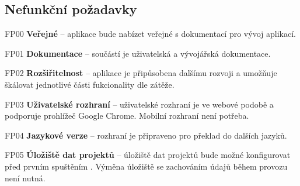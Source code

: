 \subsection{Nefunkční požadavky}
\begin{dl}
   \item[FP00] \textbf{Veřejné } – aplikace bude nabízet veřejné  s dokumentací pro vývoj aplikací.
   \item[FP01] \textbf{Dokumentace} – součástí  je uživatelská a vývojářská dokumentace.
   \item[FP02] \textbf{Rozšiřitelnost} – aplikace je připůsobena dalšímu rozvoji a umožňuje škálovat jednotlivé části fukcionality dle zátěže.
   \item[FP03] \textbf{Uživatelské rozhraní} – uživatelské rozhraní je ve webové podobě a podporuje prohlížeč Google Chrome.
   Mobilní rozhraní není potřeba.
   \item[FP04] \textbf{Jazykové verze} – rozhraní je připraveno pro překlad do dalších jazyků.
   \item[FP05] \textbf{Úložiště dat projektů} – úložiště dat projektů bude možné konfigurovat před prvním spuštěním .
   Výměna úložiště se zachováním údajů během provozu  není nutná.
\end{dl}





